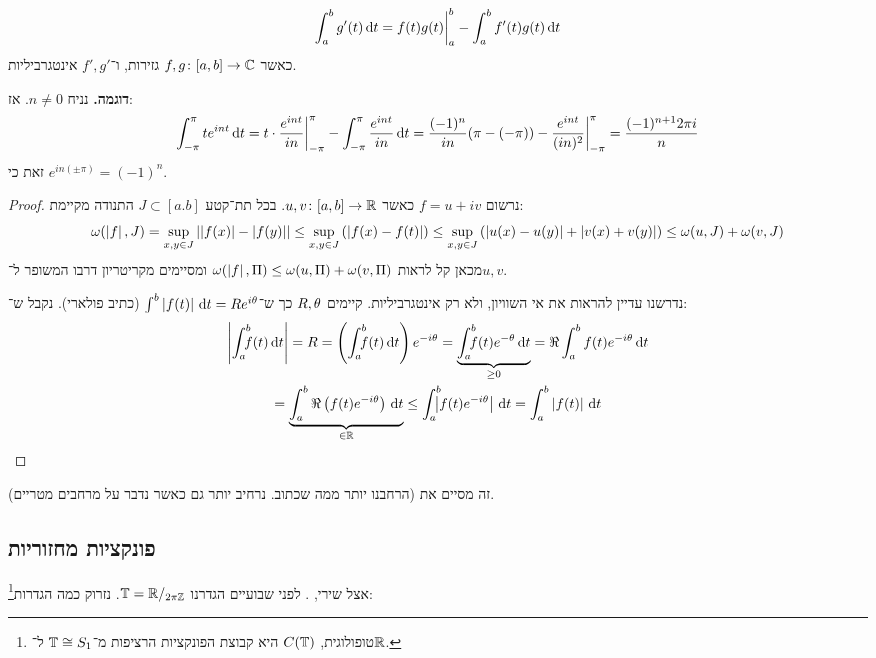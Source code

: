 \documentclass[]{../../../../tex/classes/styledArticle}
\begin{document}
	
	\begin{Theorem}
		\[ \int^{b}_a g'(t)\,\mathrm{d}t = f(t)g(t)\bigg\vert^{b}_a - \int^{b}_a f'(t)g(t)\,\mathrm{d}t \]
		כאשר $f, g \colon [a, b] \to \mathbb{C}$ גזירות, ו־$f', g'$ אינטגרביליות. 
	\end{Theorem}
	
	\textbf{דוגמה. }נניח $n \neq 0$. אז: 
	\[ \int^{\pi}_{- \pi}te^{i nt}\,\mathrm{d}t = t \cdot \frac{e^{i nt}}{in}\bigg\vert^{\pi}_{- \pi} - \int^{\pi}_{- \pi} \frac{e^{int}}{in}\,\mathrm{d}t = \frac{(-1)^{n}}{in}(\pi - (-\pi)) - \frac{e^{int}}{(in)^{2}}\bigg\vert^{\pi}_{-\pi} = \frac{(-1)^{n + 1}2\pi i}{n}\]
	זאת כי $e^{in(\pm\pi)} = (-1)^{n}$. 
	
	\begin{proof}
		נרשום $f =u + iv$ כאשר $u, v \colon [a, b] \to \mathbb{R}$. בכל תת־קטע $J \subset [a. b]$ התנודה מקיימת: 
		\[ \omega(\left \lvert f \right \rvert, J) = \sup_{x, y \in J}\left \lvert \left \lvert f(x) \right \rvert - \left \lvert f(y) \right \rvert \right \rvert \le \sup_{x, y \in J}\left ( \left \lvert f(x) - f(t) \right \rvert \right ) \le \sup_{x, y \in J}\left ( \left \lvert u(x) - u(y) \right \rvert + \left \lvert v(x) + v(y) \right \rvert \right ) \le \omega(u, J) + \omega(v, J) \]
		מכאן קל לראות $\omega(\left \lvert f \right \rvert, \Pi) \le \omega(u, \Pi) + \omega(v, \Pi)$ ומסיימים מקריטריון דרבו המשופר ל־$u, v$. 
		
		נדרשנו עדיין להראות את אי השוויון, ולא רק אינטגרביליות. קיימים $R, \theta$ כך ש־$\int^{b}\left \lvert f(t) \right \rvert\,\mathrm{d}t = Re^{i\theta}$ (כתיב פולארי). נקבל ש־: 
		\begin{multline*}
			\sof{\int^{b}_a \dequad \ f(t)\dt} = R = \cl{\int^{b}_a\dequad \ f(t)\dt}e^{-i\ta} =\underbrace{\int^{b}_a \dequad \ f(t)e^{-\ta}\dt}_{\ge 0} = \Re\int^{b}_a f(t)e^{-i\ta}\dt \\
			= \underbrace{\int^{b}_a \Re\cl{f(t)e^{-i\ta}}\dt }_{\in \R}\le \int^{b}_a\dequad \  \sof{f(t)e^{-i\ta}}\dt = \int^{b}_a\sof{f(t)}\dt
		\end{multline*}
	\end{proof}
	זה מסיים את  (הרחבנו יותר ממה שכתוב. נרחיב יותר גם כאשר נדבר על מרחבים מטריים). 
	
	\subsection*{פונקציות מחזוריות}
	אצל שירי, . לפני שבועיים הגדרנו $\mathbb{T} = \mathbb{R}/_{2 \pi \mathbb{Z}}$. נזרוק כמה הגדרות\footnote{טופולוגית, $C(\mathbb{T})$ היא קבוצת הפונקציות הרציפות מ־$\mathbb{T} \cong S_1$ ל־$\mathbb{R}$. }: 
	
\end{document}
